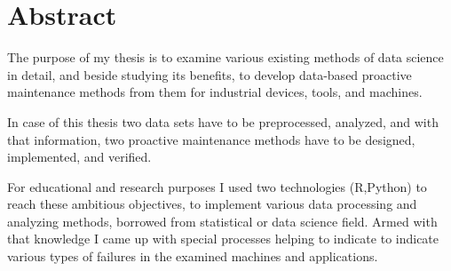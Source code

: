\chapter*{Abstract}

The purpose of my thesis is to examine various existing methods of data science in detail, and beside studying its benefits, to develop data-based proactive maintenance methods from them for industrial devices, tools, and machines.

In case of this thesis two data sets have to be preprocessed, analyzed, and with that information, two proactive maintenance methods have to be designed, implemented, and verified.

For educational and research purposes I used two technologies (R,Python) to reach these ambitious objectives, to implement various data processing and analyzing methods, borrowed from statistical or data science field. Armed with that knowledge I came up with special processes helping to indicate to indicate various types of failures in the examined machines and applications.
